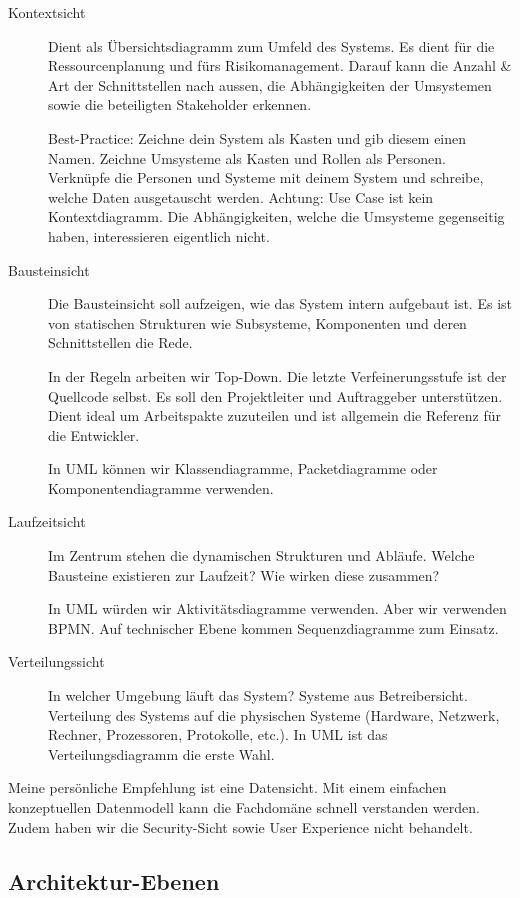\begin{description}
	\item[Kontextsicht] Dient als Übersichtsdiagramm zum Umfeld des Systems. Es dient für die Ressourcenplanung und fürs Risikomanagement. Darauf kann die Anzahl \& Art der Schnittstellen nach aussen, die Abhängigkeiten der Umsystemen sowie die beteiligten Stakeholder erkennen.
	
	Best-Practice: Zeichne dein System als Kasten und gib diesem einen Namen. Zeichne Umsysteme als Kasten und Rollen als Personen. Verknüpfe die Personen und Systeme mit deinem System und schreibe, welche Daten ausgetauscht werden. Achtung: Use Case ist kein Kontextdiagramm. Die Abhängigkeiten, welche die Umsysteme gegenseitig haben, interessieren eigentlich nicht.
	
	\item[Bausteinsicht] Die Bausteinsicht soll aufzeigen, wie das System intern aufgebaut ist. Es ist von statischen Strukturen wie Subsysteme, Komponenten und deren Schnittstellen die Rede.
	
	In der Regeln arbeiten wir Top-Down. Die letzte Verfeinerungsstufe ist der Quellcode selbst. Es soll den Projektleiter und Auftraggeber unterstützen. Dient ideal um Arbeitspakte zuzuteilen und ist allgemein die Referenz für die Entwickler.
	
	In UML können wir Klassendiagramme, Packetdiagramme oder Komponentendiagramme verwenden.
	
	\item[Laufzeitsicht] Im Zentrum stehen die dynamischen Strukturen und Abläufe. Welche Bausteine existieren zur Laufzeit? Wie wirken diese zusammen?
	
	In UML würden wir Aktivitätsdiagramme verwenden. Aber wir verwenden BPMN. Auf technischer Ebene kommen Sequenzdiagramme zum Einsatz.
	
	\item[Verteilungssicht] In welcher Umgebung läuft das System? Systeme aus Betreibersicht. Verteilung des Systems auf die physischen Systeme (Hardware, Netzwerk, Rechner, Prozessoren, Protokolle, etc.). In UML ist das Verteilungsdiagramm die erste Wahl.
\end{description}

Meine persönliche Empfehlung ist eine Datensicht. Mit einem einfachen konzeptuellen Datenmodell kann die Fachdomäne schnell verstanden werden. Zudem haben wir die Security-Sicht sowie User Experience nicht behandelt.

\subsection{Architektur-Ebenen}


